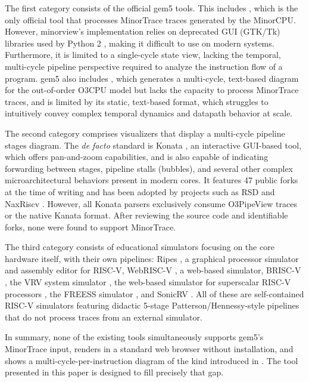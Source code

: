 \documentclass{ceurart}
\begin{document}
The first category consists of the official gem5 tools. This includes , which is the only official tool that processes MinorTrace traces generated by the MinorCPU. However, minorview's implementation relies on deprecated GUI (GTK/Tk) libraries used by Python 2 \cite{minorviewGtkSrc,gnome_pygobject_porting}, making it difficult to use on modern systems. Furthermore, it is limited to a single-cycle state view, lacking the temporal, multi-cycle pipeline perspective required to analyze the instruction flow of a program. gem5 also includes , which generates a multi-cycle, text-based diagram for the out-of-order O3CPU model \cite{gem5o3cpu} but lacks the capacity to process MinorTrace traces, and is limited by its static, text-based format, which struggles to intuitively convey complex temporal dynamics and datapath behavior at scale.

The second category comprises visualizers that display a multi-cycle pipeline stages diagram. The \textit{de facto} standard is Konata \cite{shioya2025konata}, an interactive GUI-based tool, which offers pan-and-zoom capabilities, and is also capable of indicating forwarding between stages, pipeline stalls (bubbles), and several other complex microarchitectural behaviors present in modern cores. It features 47 public forks at the time of writing and has been adopted by projects such as RSD \cite{mashimo2019open} and NaxRiscv \cite{NaxRiscv}. However, all Konata parsers exclusively consume O3PipeView traces or the native Kanata format. After reviewing the source code and identifiable forks, none were found to support MinorTrace.

The third category consists of educational simulators focusing on the core hardware itself, with their own pipelines: Ripes \cite{petersen2021ripes}, a graphical processor simulator and assembly editor for RISC-V, WebRISC-V \cite{giorgi2019webrisc,giorgi2025webrisc}, a web-based simulator, BRISC-V \cite{bandara2019brisc}, the VRV system simulator \cite{krim2025vrv}, the web-based simulator for superscalar RISC-V processors \cite{jaros2024web}, the FREESS simulator \cite{giorgi2025freess}, and SonicRV \cite{grosse2026sonicrv}. All of these are self-contained RISC-V simulators featuring didactic 5-stage Patterson/Hennessy-style pipelines that do not process traces from an external simulator.

In summary, none of the existing tools simultaneously supports gem5's MinorTrace input, renders in a standard web browser without installation, and shows a multi-cycle-per-instruction diagram of the kind introduced in \cite{patterson2020computer}. The tool presented in this paper is designed to fill precisely that gap.
\end{document}
